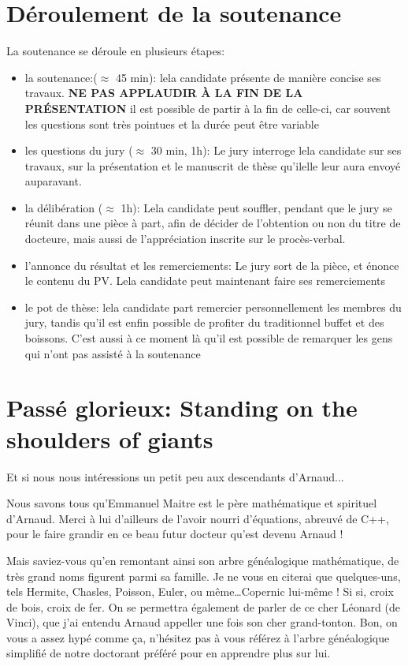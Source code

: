 \documentclass[a4paper]{leaflet}
\newcommand{\ei}{\textperiodcentered}
\begin{document}
\section*{Déroulement de la soutenance}
La soutenance se déroule en plusieurs étapes:
\begin{itemize}
\item la soutenance:($\approx$ 45 min):
  le\ei la candidat\ei e présente de manière concise ses travaux.
  \textbf{NE PAS APPLAUDIR À LA FIN DE LA PRÉSENTATION}
  il est possible de partir à la fin de celle-ci, car souvent les questions sont très pointues et la durée peut être variable
\item les questions du jury ($\approx$ 30 min, 1h):
  Le jury interroge le\ei la candidat\ei e sur ses travaux, sur la présentation et le manuscrit de thèse qu'il\ei elle leur aura envoyé auparavant.
\item la délibération ($\approx$ 1h):
  Le\ei la candidat\ei e peut souffler, pendant que le jury se réunit dans une pièce à part, afin de décider de l'obtention ou non du titre de docteur\ei e, mais aussi de l'appréciation inscrite sur le procès-verbal.
\item l'annonce du résultat et les remerciements:
  Le jury sort de la pièce, et énonce le contenu du PV. Le\ei la candidat\ei e peut maintenant faire ses remerciements
\item le pot de thèse:
  le\ei la candidat\ei e part remercier personnellement les membres du jury, tandis qu'il est enfin possible de profiter du traditionnel buffet et des boissons. C'est aussi à ce moment là qu'il est possible de remarquer les gens qui n'ont pas assisté à la soutenance
\end{itemize}

\section*{Passé glorieux: Standing on the shoulders of giants}

Et si nous nous intéressions un petit peu aux descendants d'Arnaud...

Nous savons tous qu'Emmanuel Maitre est le père mathématique et spirituel d'Arnaud. Merci à lui d'ailleurs de l'avoir nourri d'équations, abreuvé de C++, pour le faire grandir en ce beau futur docteur qu'est devenu Arnaud ! 

Mais saviez-vous qu'en remontant ainsi son arbre généalogique mathématique, de très grand noms figurent parmi sa famille. Je ne vous en citerai que quelques-uns, tels Hermite, Chasles, Poisson, Euler, ou même\dots Copernic lui-même ! Si si, croix de bois, croix de fer. On se permettra également de parler de ce cher Léonard (de Vinci), que j'ai entendu Arnaud appeller une fois son \og cher grand-tonton\fg. Bon, on vous a assez hypé comme ça, n'hésitez pas à vous référez à l'arbre généalogique simplifié de notre doctorant préféré pour en apprendre plus sur lui. 
\end{document}
